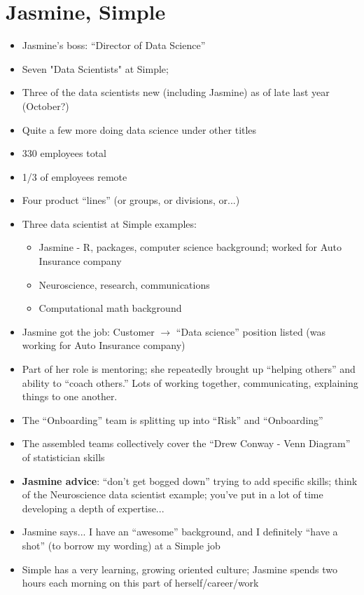 \documentclass{article}
\begin{document}
\section*{Jasmine, Simple}
\begin{itemize}
\item Jasmine's boss: ``Director of Data Science''
\item Seven "Data Scientists" at Simple;
\item Three of the data scientists new (including Jasmine) as of late last year (October?)
\item Quite a few more doing data science under other titles
\item 330 employees total
\item 1/3 of employees remote
\item Four product ``lines'' (or groups, or divisions, or...)
\item Three data scientist at Simple examples:
  \begin{itemize}
  \item Jasmine - R, packages, computer science background; worked for Auto Insurance company
  \item Neuroscience, research, communications
  \item Computational math background
  \end{itemize}
\item Jasmine got the job: Customer $\rightarrow$ ``Data science'' position listed (was working for Auto Insurance company)
\item Part of her role is mentoring; she repeatedly brought up ``helping others'' and ability to ``coach others.'' Lots of working together, communicating, explaining things to one another.
\item The ``Onboarding'' team is splitting up into ``Risk'' and ``Onboarding''
\item The assembled teams collectively cover the ``Drew Conway - Venn Diagram'' of statistician skills
\item {\bf Jasmine advice}: ``don't get bogged down'' trying to add specific skills; think of the Neuroscience data scientist example; you've put in a lot of time developing a depth of expertise...
\item Jasmine says... I have an ``awesome'' background, and I definitely ``have a shot'' (to borrow my wording) at a Simple job
\item Simple has a very learning, growing oriented culture; Jasmine spends two hours each morning on this part of herself/career/work

\end{itemize}
\end{document}
